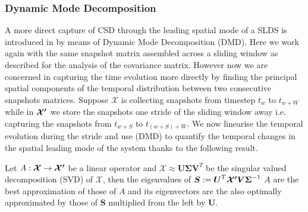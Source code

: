 \documentclass[../main.tex]{subfiles}
\begin{document}
\subsubsection{Dynamic Mode Decomposition}\label{subsubsec3.2.2}
A more direct capture of CSD through the leading spatial mode of a SLDS is introduced in \cite{Donovan22} by means of Dynamic Mode Decomposition (DMD).
Here we work again with the same snapshot matrix assembled across a sliding window as described for the analysis of the covariance matrix.
However now we are concerned in capturing the time evolution more directly by finding the principal spatial components of the temporal distribution between two consecutive snapshots matrices.
Suppose $\boldsymbol{\mathcal{X}}$ is collecting snapshots from timestep $t_{w}$ to $t_{w+W}$ while in $\boldsymbol{\mathcal{X'}}$ we store the snapshots one stride of the sliding window away i.e. capturing the snapshots from $t_{w+S}$ to $t_{(w+S)+W}$.
We now linearise the temporal evolution during the stride and use (DMD) to quantify the temporal changes in the spatial leading mode of the system thanks to the following result.
\begin{theorem}[label=thm2.2]{}{}
     Let $A:\boldsymbol{\mathcal{X}}\to \boldsymbol{\mathcal{X'}}$ be a linear operator and $\boldsymbol{\mathcal{X}}\approx \boldsymbol{U}\boldsymbol{\Sigma}\boldsymbol{V}^{T}$ be the singular valued decomposition (SVD) of $\boldsymbol{\mathcal{X}}$, then the eigenvalues of $\boldsymbol{S}:= \boldsymbol{U}^{T}\boldsymbol{\mathcal{X'}}\boldsymbol{V}\boldsymbol{\Sigma}^{-1}$ $A$ are the best approximation of those of $A$ and its eigenvectors are the also optimally approximated by those of $\boldsymbol{S}$ multiplied from the left by $\boldsymbol{U}$.
\end{theorem}
\end{document}
